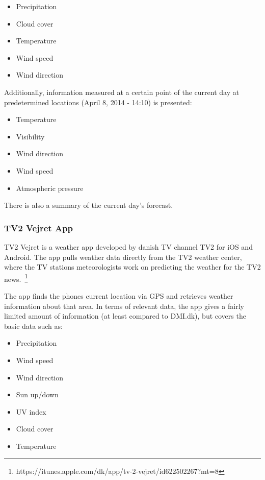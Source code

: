 \begin{itemize}
    \item Precipitation
    \item Cloud cover
    \item Temperature
    \item Wind speed
    \item Wind direction
\end{itemize}

Additionally, information measured at a certain point of the current day at predetermined locations (April 8, 2014 - 14:10) is presented:

\begin{itemize}
    \item Temperature
    \item Visibility
    \item Wind direction
    \item Wind speed
    \item Atmospheric pressure
\end{itemize}

There is also a summary of the current day’s forecast.


\FloatBarrier
\subsubsection*{TV2 Vejret App} %
\label{ssub:tv2_vejret_app}

TV2 Vejret is a weather app developed by danish TV channel TV2 for iOS and Android. 
The app pulls weather data directly from the TV2 weather center, where the TV stations meteorologists work on predicting the weather for the TV2 news.~\footnote{https://itunes.apple.com/dk/app/tv-2-vejret/id622502267?mt=8}


The app finds the phones current location via GPS and retrieves weather information about that area. In terms of relevant data, the app gives a fairly limited amount of information (at least compared to DMI.dk), but covers the basic data such as:

\begin{itemize}
    \item Precipitation
    \item Wind speed
    \item Wind direction
    \item Sun up/down
    \item UV index
    \item Cloud cover
    \item Temperature
\end{itemize} 

